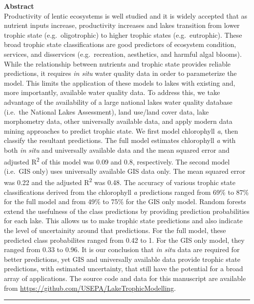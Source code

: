 \documentclass[11pt,]{article}
\begin{document}
\textbf{Abstract}\\Productivity of lentic ecosystems is well studied and
it is widely accepted that as nutrient inputs increase, productivity
increases and lakes transition from lower trophic state
(e.g.~oligotrophic) to higher trophic states (e.g.~eutrophic). These
broad trophic state classifications are good predictors of ecosystem
condition, services, and disservices (e.g.~recreation, aesthetics, and
harmful algal blooms). While the relationship between nutrients and
trophic state provides reliable predictions, it requires \emph{in situ}
water quality data in order to parameterize the model. This limits the
application of these models to lakes with existing and, more
importantly, available water quality data. To address this, we take
advantage of the availability of a large national lakes water quality
database (i.e.~the National Lakes Assessment), land use/land cover data,
lake morphometry data, other universally available data, and apply
modern data mining approaches to predict trophic state. We first model
chlorophyll \emph{a}, then classify the resultant predictions. The full
model estimates chlorophyll \emph{a} with both \emph{in situ} and
universally available data and the mean squared error and adjusted
R\textsuperscript{2} of this model was 0.09 and 0.8, respectively. The
second model (i.e.~GIS only) uses universally available GIS data only.
The mean squared error was 0.22 and the adjusted R\textsuperscript{2}
was 0.48. The accuracy of various trophic state classifications derived
from the chlorophyll \emph{a} predictions ranged from 69\% to 87\% for
the full model and from 49\% to 75\% for the GIS only model. Random
forests extend the usefulness of the class predictions by providing
prediction probabilities for each lake. This allows us to make trophic
state predictions and also indicate the level of uncertainity around
that predictions. For the full model, these predicted class probabilites
ranged from 0.42 to 1. For the GIS only model, they ranged from 0.33 to
0.96. It is our conclusion that \emph{in situ} data are required for
better predictions, yet GIS and universally available data provide
trophic state predictions, with estimated uncertainty, that still have
the potential for a broad array of applications. The source code and
data for this manuscript are available from
\url{https://github.com/USEPA/LakeTrophicModelling}.

\vspace{3mm}

\hrule
\end{document}
